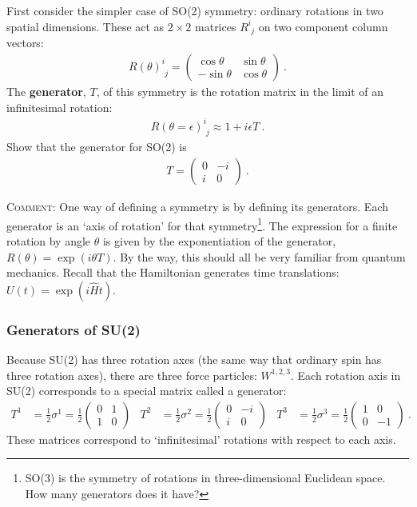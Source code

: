 \documentclass[12pt]{article}
\begin{document}
First consider the simpler case of SO(2) symmetry: ordinary rotations in two spatial dimensions. These act as $2\times 2$ matrices $R^i_{\phantom i j}$ on two component column vectors:
\begin{align}
	R(\theta)^i_{\phantom i j} =
	\begin{pmatrix}
	\cos\theta & \sin\theta
	\\
	-\sin\theta & \cos\theta
	\end{pmatrix} \ .
\end{align}
The \textbf{generator}, $T$, of this symmetry is the rotation matrix in the limit of an infinitesimal rotation:
\begin{align}
	R(\theta=\epsilon)^i_{\phantom{i}j} \approx 1 + i \epsilon T \ .
\end{align}
Show that the generator for SO(2) is
\begin{align}
	T = \begin{pmatrix}
		0 & -i
		\\
		i & 0 
	\end{pmatrix} \ .
\end{align}

\textsc{Comment}: One way of defining a symmetry is by defining its generators. Each generator is an `axis of rotation' for that symmetry\footnote{SO(3) is the symmetry of rotations in three-dimensional Euclidean space. How many generators does it have?}. The expression for a finite rotation by angle $\theta$ is given by the exponentiation of the generator, $R(\theta) = \exp(i\theta T)$. By the way, this should all be very familiar from quantum mechanics. Recall that the Hamiltonian generates time translations: $U(t) = \exp(i\hat H t)$.



\subsubsection{Generators of SU(2)}

Because SU(2) has three rotation axes (the same way that ordinary spin has three rotation axes), there are three force particles: $W^{1,2,3}$. Each rotation axis in SU(2) corresponds to a special matrix called a generator:
\begin{align}
	T^1 
	&= \frac{1}{2}\sigma^1
	= 
	\frac{1}{2}
	\begin{pmatrix}
	0 & 1\\
	1 & 0
	\end{pmatrix}
	&
	T^2 
	&= \frac{1}{2}\sigma^2
	= 
	\frac{1}{2}
	\begin{pmatrix}
	0 & -i\\
	i & 0
	\end{pmatrix}
	&
	T^3 
	&= \frac{1}{2}\sigma^3
	= 
	\frac{1}{2}
	\begin{pmatrix}
	1 & 0\\
	0 & -1
	\end{pmatrix} \ .
\end{align}
These matrices correspond to `infinitesimal' rotations with respect to each axis. 
\end{document}
